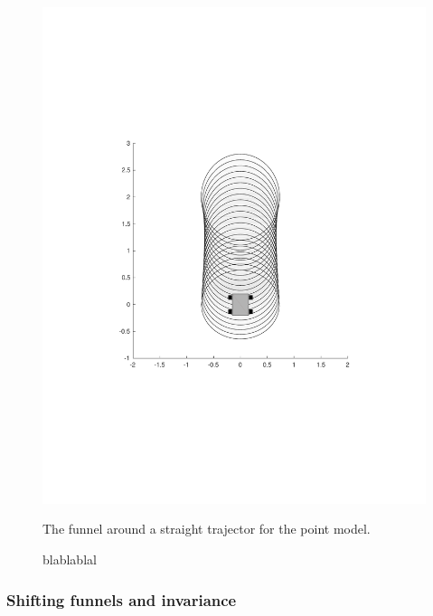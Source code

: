 \begin{figure}
\begin{minipage}{0.4\textwidth}
    \includegraphics[scale=.3]{figures/method/expanded-funnel-with-car}
    \caption{The funnel around a straight trajector for the point model.}
  \end{minipage}
  \caption{blablablal}
  \label{fig:expanded-and-unexpanded}
\end{figure}

\subsubsection{Shifting funnels and invariance}

